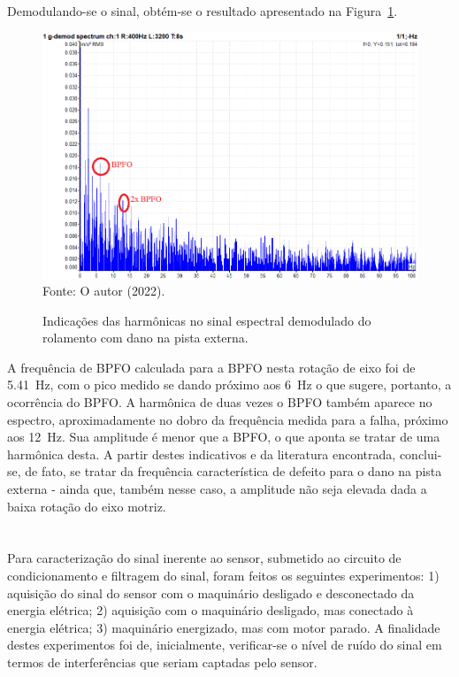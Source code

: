 \documentclass[
	12pt,				
	oneside,			
	a4paper,			
	english,			
	brazil,	
	sumario=abnt-6027-2012		
	]{abntex2ppgsi}
\begin{document}
Demodulando-se o sinal, obtém-se o resultado apresentado na Figura~\ref{PISTA_EXTERNA_DEMODULADA_anotada}.
 
\begin{figure}[!htb]
\centering
\caption {Indicações das harmônicas no sinal espectral demodulado do rolamento com dano na pista externa.}
\includegraphics[width=\textwidth,keepaspectratio]{PISTA_EXTERNA_DEMODULADA_anotada} \\
Fonte: O autor (2022).
\label{PISTA_EXTERNA_DEMODULADA_anotada}
\end{figure} 

A frequência de BPFO calculada para a BPFO nesta rotação de eixo foi de \SI{5.41}{\hertz}, com o pico medido se dando próximo aos \SI{6}{\hertz} o que sugere, portanto, a ocorrência do BPFO. A harmônica de duas vezes o BPFO também aparece no espectro, aproximadamente no dobro da frequência medida para a falha, próximo aos \SI{12}{\hertz}. Sua amplitude é menor que a BPFO, o que aponta se tratar de uma harmônica desta. A partir destes indicativos e da literatura encontrada, conclui-se, de fato, se tratar da frequência característica de defeito para o dano na pista externa - ainda que, também nesse caso, a amplitude não seja elevada dada a baixa rotação do eixo motriz.

\newpage
\section{}

Para caracterização do sinal inerente ao sensor, submetido ao circuito de condicionamento e filtragem do sinal, foram feitos os seguintes experimentos: 1) aquisição do sinal do sensor com o maquinário desligado e desconectado da energia elétrica; 2) aquisição com o maquinário desligado, mas conectado à energia elétrica; 3) maquinário energizado, mas com motor parado. A finalidade destes experimentos foi de, inicialmente, verificar-se o nível de ruído do sinal em termos de interferências que seriam captadas pelo sensor.
\end{document}
